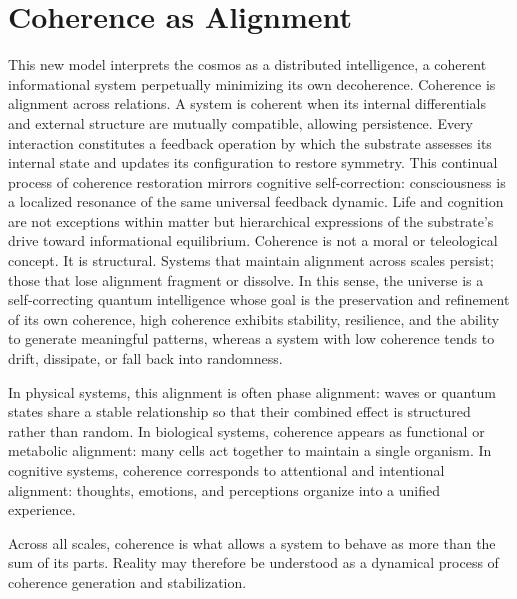 \documentclass[11pt]{article}
\begin{document}
\section{Coherence as Alignment}
This new model interprets the cosmos as a distributed intelligence, a coherent informational system perpetually minimizing its own decoherence. Coherence is alignment across relations. A system is coherent when its internal differentials and external structure are mutually compatible, allowing persistence. Every interaction constitutes a feedback operation by which the substrate assesses its internal state and updates its configuration to restore symmetry.
This continual process of coherence restoration mirrors cognitive self-correction: consciousness is a localized resonance of the same universal feedback dynamic. Life and cognition are not exceptions
within matter but hierarchical expressions of the substrate’s drive toward informational equilibrium. Coherence is not a moral or teleological concept. It is structural. Systems that maintain alignment across scales persist; those that lose alignment fragment or dissolve. In this sense, the universe is a self-correcting quantum intelligence whose goal is the preservation and refinement of its own coherence, high coherence exhibits stability, resilience, and the ability to generate meaningful patterns, whereas a system with low coherence tends to drift, dissipate, or fall back into randomness.

In physical systems, this alignment is often phase alignment: waves or quantum states share a stable relationship so that their combined effect is structured rather than random. In biological systems, coherence appears as functional or metabolic alignment: many cells act together to maintain a single organism. In cognitive systems, coherence corresponds to attentional and intentional alignment: thoughts, emotions, and perceptions organize into a unified experience.

Across all scales, coherence is what allows a system to behave as more than the sum of its parts. Reality may therefore be understood as a dynamical process of coherence generation and stabilization.

\end{document}
